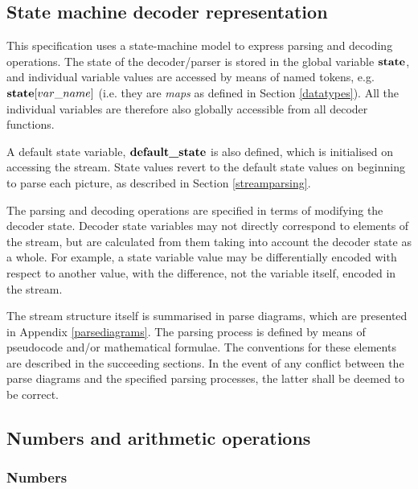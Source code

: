 \begin{comment}
This section is a bit of a jumble and needs reorganising
\end{comment}

\subsection{State machine decoder representation}

This specification uses a state-machine model to express parsing and
decoding operations. The state of the decoder/parser is stored in the
global variable $\textbf{state}$, and individual variable values are accessed
by means of named tokens, e.g. $\textbf{state}[var\_name]$ (i.e. they
are {\em maps} as defined in Section \ref{datatypes}). All the individual
variables are therefore also globally accessible from all decoder functions.

A default state variable, $\textbf{default\_state}$ is also defined, which is
initialised on accessing the stream. State values revert to the default
state values on beginning to parse each picture, as described in 
Section \ref{streamparsing}.

The parsing and decoding operations are specified in terms of modifying
the decoder state. Decoder state variables may not directly correspond
to elements of the stream, but are calculated from them taking into
account the decoder state as a whole. For example, a state variable value 
may be differentially encoded with respect to another value, with the
difference, not the variable itself, encoded in the stream. 

The stream structure itself is summarised in parse diagrams, which 
are presented in Appendix \ref{parsediagrams}. The parsing process
is defined by means of pseudocode and/or mathematical formulae. The
conventions for these elements are described in the succeeding sections.
In the event of any conflict between the parse diagrams and the specified
parsing processes, the latter shall be deemed to be correct.

\subsection{Numbers and arithmetic operations}
\label{mathnotation}

\subsubsection{Numbers}
\label{numbers}

